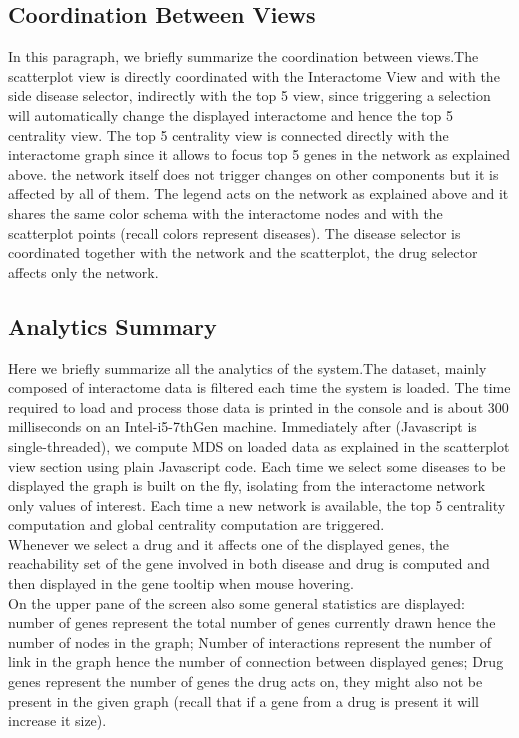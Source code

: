 \documentclass[12pt,twocolumn,twoside]{article}
\begin{document}
	\subsection*{Coordination Between Views}
	In this paragraph, we briefly summarize the coordination between views.\newline The scatterplot view is directly coordinated with the Interactome View and with the side disease selector, indirectly with the top 5 view, since triggering a selection will automatically change the displayed interactome and hence the top 5 centrality view.
	The top 5 centrality view is connected directly with the interactome graph since it allows to focus top 5 genes in the network as explained above. the network itself does not trigger changes on other components but it is affected by all of them. The legend acts on the network as explained above and it shares the same color schema with the interactome nodes and with the scatterplot points (recall colors represent diseases). The disease selector is coordinated together with the network and the scatterplot, the drug selector affects only the network.
	
	
	\subsection*{Analytics Summary}
	Here we briefly summarize all the analytics of the system.\newline The dataset, mainly composed of interactome data is filtered each time the system is loaded. The time required to load and process those data is printed in the console and is about 300 milliseconds on an Intel-i5-7thGen machine. Immediately after (Javascript is single-threaded), we compute MDS on loaded data as explained in the scatterplot view section using plain Javascript code. Each time we select some diseases to be displayed the graph is built on the fly, isolating from the interactome network only values of interest. Each time a new network is available, the top 5 centrality computation and global centrality computation are triggered.\\ Whenever we select a drug and it affects one of the displayed genes, the reachability set of the gene involved in both disease and drug is computed and then displayed in the gene tooltip when mouse hovering.\\ On the upper pane of the screen also some general statistics are displayed: number of genes represent the total number of genes currently drawn hence the number of nodes in the graph; Number of interactions represent the number of link in the graph hence the number of connection between displayed genes; Drug genes represent the number of genes the drug acts on, they might also not be present in the given graph (recall that if a gene from a drug is present it will increase it size). 
	
\end{document}
